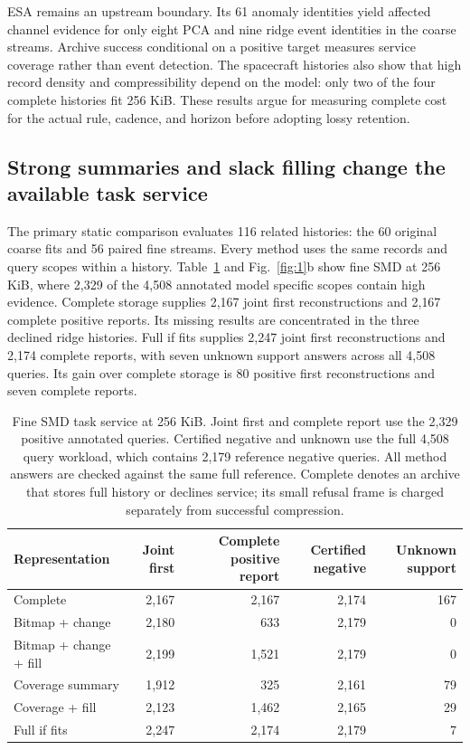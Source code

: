 \documentclass[a4paper,fleqn]{cas-dc}
\begin{document}
ESA remains an upstream boundary. Its 61 anomaly identities yield affected channel evidence for only eight PCA and nine ridge event identities in the coarse streams. Archive success conditional on a positive target measures service coverage rather than event detection. The spacecraft histories also show that high record density and compressibility depend on the model: only two of the four complete histories fit 256 KiB. These results argue for measuring complete cost for the actual rule, cadence, and horizon before adopting lossy retention.

\subsection{Strong summaries and slack filling change the available task service}

The primary static comparison evaluates 116 related histories: the 60 original coarse fits and 56 paired fine streams. Every method uses the same records and query scopes within a history. Table~\ref{tab:2} and Fig.~\ref{fig:1}b show fine SMD at 256 KiB, where 2{,}329 of the 4{,}508 annotated model specific scopes contain high evidence. Complete storage supplies 2{,}167 joint first reconstructions and 2{,}167 complete positive reports. Its missing results are concentrated in the three declined ridge histories. Full if fits supplies 2{,}247 joint first reconstructions and 2{,}174 complete reports, with seven unknown support answers across all 4{,}508 queries. Its gain over complete storage is 80 positive first reconstructions and seven complete reports.

\begin{table}
\caption{Fine SMD task service at 256 KiB. Joint first and complete report use the 2{,}329 positive annotated queries. Certified negative and unknown use the full 4{,}508 query workload, which contains 2{,}179 reference negative queries. All method answers are checked against the same full reference. Complete denotes an archive that stores full history or declines service; its small refusal frame is charged separately from successful compression.}
\label{tab:2}
\small
\begin{tabular*}{\textwidth}{@{\extracolsep{\fill}}lrrrr@{}}
\toprule
Representation & Joint first & Complete positive report & Certified negative & Unknown support \\
\midrule
Complete & 2{,}167 & 2{,}167 & 2{,}174 & 167 \\
Bitmap + change & 2{,}180 & 633 & 2{,}179 & 0 \\
Bitmap + change + fill & 2{,}199 & 1{,}521 & 2{,}179 & 0 \\
Coverage summary & 1{,}912 & 325 & 2{,}161 & 79 \\
Coverage + fill & 2{,}123 & 1{,}462 & 2{,}165 & 29 \\
Full if fits & 2{,}247 & 2{,}174 & 2{,}179 & 7 \\
\bottomrule
\end{tabular*}
\end{table}
\end{document}
